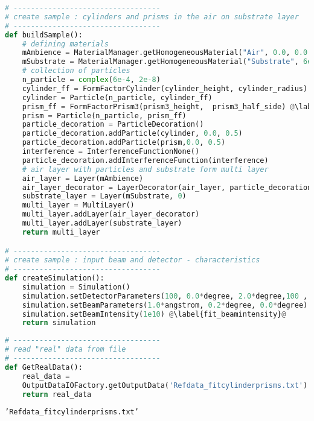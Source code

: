 \begin{lstlisting}[language=python, style=eclipseboxed, name=exfit,nolol]
# ----------------------------------
# create sample : cylinders and prisms in the air on substrate layer
# ----------------------------------
def buildSample(): 
    # defining materials
    mAmbience = MaterialManager.getHomogeneousMaterial("Air", 0.0, 0.0 )
    mSubstrate = MaterialManager.getHomogeneousMaterial("Substrate", 6e-6, 2e-8 )
    # collection of particles
    n_particle = complex(6e-4, 2e-8)
    cylinder_ff = FormFactorCylinder(cylinder_height, cylinder_radius) @\label{fit_cylff}@
    cylinder = Particle(n_particle, cylinder_ff)
    prism_ff = FormFactorPrism3(prism3_height,  prism3_half_side) @\label{fit_prismff}@
    prism = Particle(n_particle, prism_ff)
    particle_decoration = ParticleDecoration()
    particle_decoration.addParticle(cylinder, 0.0, 0.5)
    particle_decoration.addParticle(prism,0.0, 0.5)  
    interference = InterferenceFunctionNone()
    particle_decoration.addInterferenceFunction(interference)
    # air layer with particles and substrate form multi layer
    air_layer = Layer(mAmbience)
    air_layer_decorator = LayerDecorator(air_layer, particle_decoration)
    substrate_layer = Layer(mSubstrate, 0)
    multi_layer = MultiLayer()
    multi_layer.addLayer(air_layer_decorator)
    multi_layer.addLayer(substrate_layer)
    return multi_layer

# ----------------------------------
# create sample : input beam and detector - characteristics
# ----------------------------------
def createSimulation():
    simulation = Simulation()
    simulation.setDetectorParameters(100, 0.0*degree, 2.0*degree,100 , 0.0*degree, 2.0*degree)
    simulation.setBeamParameters(1.0*angstrom, 0.2*degree, 0.0*degree)
    simulation.setBeamIntensity(1e10) @\label{fit_beamintensity}@
    return simulation
\end{lstlisting}

\begin{lstlisting}[language=python, style=eclipseboxed, name=exfit,nolol]
# ----------------------------------
# read "real" data from file
# ----------------------------------
def GetRealData(): 
    real_data =
    OutputDataIOFactory.getOutputData('Refdata_fitcylinderprisms.txt') @\label{fit_input_realdata}@
    return real_data
\end{lstlisting}

\texttt{'Refdata\_fitcylinderprisms.txt'}
 
